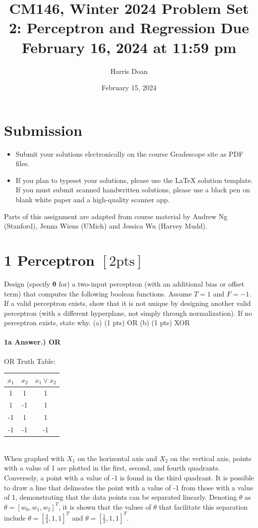 \documentclass[10pt]{article}
\title{CM146, Winter 2024 
 Problem Set 2: Perceptron and Regression 
 Due February 16, 2024 at 11:59 pm }
\author{Harris Doan}
\date{February 15, 2024}
\begin{document}
\maketitle
\section*{Submission}
\begin{itemize}
  \item Submit your solutions electronically on the course Gradescope site as PDF files.
  \item If you plan to typeset your solutions, please use the LaTeX solution template. If you must submit scanned handwritten solutions, please use a black pen on blank white paper and a high-quality scanner app.
\end{itemize}

Parts of this assignment are adapted from course material by Andrew Ng (Stanford), Jenna Wiens (UMich) and Jessica Wu (Harvey Mudd).

\section*{1 Perceptron $[2 \mathrm{pts}]$}
Design (specify $\boldsymbol{\theta}$ for) a two-input perceptron (with an additional bias or offset term) that computes the following boolean functions. Assume $T=1$ and $F=-1$. If a valid perceptron exists, show that it is not unique by designing another valid perceptron (with a different hyperplane, not simply through normalization). If no perceptron exists, state why.
(a) (1 pts) OR
(b) (1 pts) XOR

\paragraph{1a Answer.) OR}
\hspace{1cm}

OR Truth Table:\\
\begin{tabular}{cc|c}
$x_1$ & $x_2$ & $x_1 \lor x_2$ \\ \hline
1 & 1 & 1 \\
1 & -1 & 1 \\
-1 & 1 & 1 \\
-1 & -1 & -1 \\
\end{tabular} \\

When graphed with $X_1$ on the horizontal axis and $X_2$ on the vertical axis,
points with a value of 1 are plotted in the first, second, and fourth quadrants.
Conversely, a point with a value of -1 is found in the third quadrant. It is possible
to draw a line that delineates the point with a value of -1 from those with a value of 1,
demonstrating that the data points can be separated linearly. Denoting $\theta$ as
$\theta = [w_0, w_1, w_2]^T$, it is shown that the values of $\theta$ that facilitate
this separation include $\theta = \left[\frac{3}{4}, 1, 1\right]^T$ and $\theta = \left[\frac{1}{2}, 1, 1\right]^T$.
\end{document}
